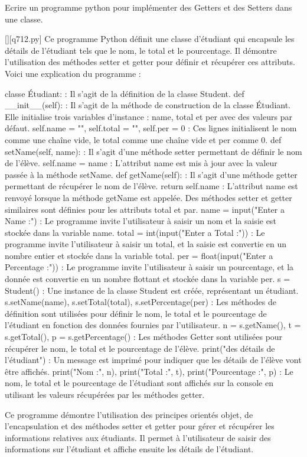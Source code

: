         \question
        Ecrire un programme python pour implémenter des Getters et des Setters dans une classe.
        \par
        \begin{solution}
            \renewcommand{\nomfichier}{q712.py}
            \pythonfile{\chemincode \nomfichier}[][\nomfichier]
            Ce programme Python définit une classe d'étudiant qui encapsule les détails de l'étudiant tels que le nom, le total et le pourcentage. Il démontre l'utilisation des méthodes setter et getter pour définir et récupérer ces attributs. Voici une explication du programme :

    classe Étudiant: : Il s'agit de la définition de la classe Student.
    def __init__(self): : Il s'agit de la méthode de construction de la classe Étudiant. Elle initialise trois variables d'instance : name, total et per avec des valeurs par défaut.
    self.name = "", self.total = "", self.per = 0 : Ces lignes initialisent le nom comme une chaîne vide, le total comme une chaîne vide et per comme 0.
    def setName(self, name): : Il s'agit d'une méthode setter permettant de définir le nom de l'élève.
    self.name = name : L'attribut name est mis à jour avec la valeur passée à la méthode setName.
    def getName(self): : Il s'agit d'une méthode getter permettant de récupérer le nom de l'élève.
    return self.name : L'attribut name est renvoyé lorsque la méthode getName est appelée.
    Des méthodes setter et getter similaires sont définies pour les attributs total et par.
    name = input("Enter a Name :") : Le programme invite l'utilisateur à saisir un nom et la saisie est stockée dans la variable name.
    total = int(input("Enter a Total :")) : Le programme invite l'utilisateur à saisir un total, et la saisie est convertie en un nombre entier et stockée dans la variable total.
    per = float(input("Enter a Percentage :")) : Le programme invite l'utilisateur à saisir un pourcentage, et la donnée est convertie en un nombre flottant et stockée dans la variable per.
    s = Student() : Une instance de la classe Student est créée, représentant un étudiant.
    s.setName(name), s.setTotal(total), s.setPercentage(per) : Les méthodes de définition sont utilisées pour définir le nom, le total et le pourcentage de l'étudiant en fonction des données fournies par l'utilisateur.
    n = s.getName(), t = s.getTotal(), p = s.getPercentage() : Les méthodes Getter sont utilisées pour récupérer le nom, le total et le pourcentage de l'élève.
    print("\nAffichage des détails de l'étudiant") : Un message est imprimé pour indiquer que les détails de l'élève vont être affichés.
    print("Nom :", n), print("Total :", t), print("Pourcentage :", p) : Le nom, le total et le pourcentage de l'étudiant sont affichés sur la console en utilisant les valeurs récupérées par les méthodes getter.

Ce programme démontre l'utilisation des principes orientés objet, de l'encapsulation et des méthodes setter et getter pour gérer et récupérer les informations relatives aux étudiants. Il permet à l'utilisateur de saisir des informations sur l'étudiant et affiche ensuite les détails de l'étudiant.
        \end{solution}
        


